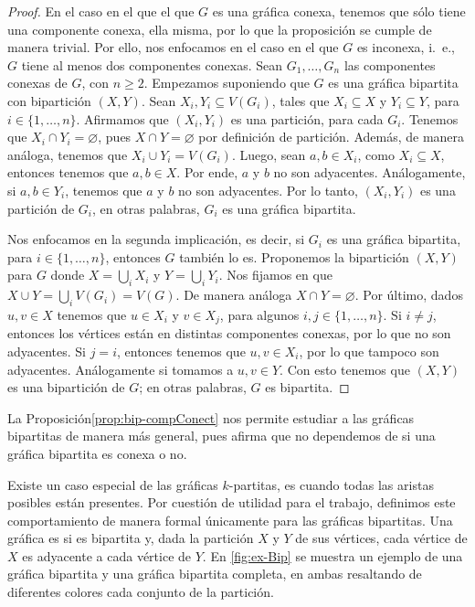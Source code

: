 \begin{proof}
    En el caso en el que el que $G$ es una gr\'afica conexa, tenemos que s\'olo
    tiene una componente conexa, ella misma, por lo que la proposici\'on se
    cumple de manera trivial. Por ello, nos enfocamos en el caso en el que $G$
    es inconexa, i.~e., $G$ tiene al menos dos componentes conexas. Sean $G_1,
    \dots, G_n$ las componentes conexas de $G$, con $n \geq 2$. Empezamos
    suponiendo que $G$ es una gr\'afica bipartita con bipartici\'on $(X,Y)$.
    Sean $X_i, Y_i\subseteq V(G_i)$, tales que $X_i \subseteq X$ y $Y_i
    \subseteq Y$, para $i \in \{1, \dots, n\}$. Afirmamos que $(X_i,Y_i)$ es una
    partici\'on, para cada $G_i$. Tenemos que $X_i \cap Y_i = \varnothing$, pues
    $X \cap Y = \varnothing$ por definici\'on de partici\'on. Adem\'as, de
    manera an\'aloga, tenemos que $X_i \cup Y_i = V(G_i)$.  Luego, sean $a, b
    \in X_i$, como $X_i \subseteq X$, entonces tenemos que $a,b \in X$. Por
    ende, $a$ y $b$ no son adyacentes. An\'alogamente, si $a,b \in Y_i$, tenemos
    que $a$ y $b$ no son adyacentes. Por lo tanto, $(X_i, Y_i)$ es una
    partici\'on de $G_i$, en otras palabras, $G_i$ es una gr\'afica bipartita.

    Nos enfocamos en la segunda implicaci\'on, es decir, si $G_i$ es una
    gr\'afica bipartita, para $i \in \{1, \dots, n\}$, entonces $G$ tambi\'en lo
    es. Proponemos la bipartici\'on $(X,Y)$ para $G$ donde $X =
    \bigcup\limits_{i} X_i$ y $Y =\bigcup\limits_{i}  Y_i$. Nos fijamos en que
    $X \cup Y = \bigcup \limits_{i}  V(G_i)=V(G)$. De manera an\'aloga $X \cap Y
    = \varnothing$. Por \'ultimo, dados $u,v \in X$ tenemos que $u \in X_i$ y $v
    \in X_j$, para algunos $i,j \in \{1, \dots,n\}$. Si $i \neq j$, entonces los
    v\'ertices est\'an en distintas componentes conexas, por lo que no son
    adyacentes. Si $j=i$, entonces tenemos que $u,v \in X_i$, por lo que tampoco
    son adyacentes. An\'alogamente si tomamos a $u,v \in Y$. Con esto tenemos
    que $(X,Y)$ es una bipartici\'on de $G$; en otras palabras, $G$ es
    bipartita.
\end{proof}

La Proposici\'on\ref{prop:bip-compConect} nos permite estudiar a las gr\'aficas
bipartitas de manera m\'as general, pues afirma que no dependemos de si una
gr\'afica bipartita es conexa o no.


Existe un caso especial de las gr\'aficas $k$-partitas, es cuando todas las
aristas posibles est\'an presentes. Por cuesti\'on de utilidad para el trabajo,
definimos este comportamiento de manera formal \'unicamente para las gr\'aficas
bipartitas. Una gr\'afica es  si es bipartita y, dada la partici\'on $X$ y
$Y$ de sus v\'ertices, cada v\'ertice de $X$ es adyacente a cada v\'ertice de
$Y$. En \cref{fig:ex-Bip} se muestra un ejemplo de una gr\'afica bipartita y una
gr\'afica bipartita completa, en ambas resaltando de diferentes colores cada
conjunto de la partici\'on. 

